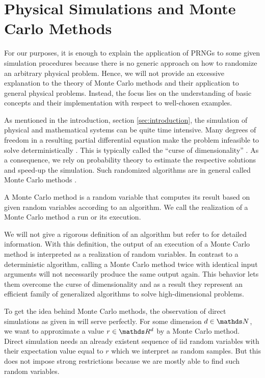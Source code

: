 \documentclass{stdlocal}
\begin{document}
\section{Physical Simulations and Monte Carlo Methods} %
\label{sub:simulation_in_physics_and_mathematics}
  For our purposes, it is enough to explain the application of PRNGs to some given simulation procedures because there is no generic approach on how to randomize an arbitrary physical problem.
  Hence, we will not provide an excessive explanation to the theory of Monte Carlo methods and their application to general physical problems.
  Instead, the focus lies on the understanding of basic concepts and their implementation with respect to well-chosen examples.

  As mentioned in the introduction, section \ref{sec:introduction}, the simulation of physical and mathematical systems can be quite time intensive.
  Many degrees of freedom in a resulting partial differential equation make the problem infeasible to solve deterministically \autocite{landau2014}.
  This is typically called the \enquote{curse of dimensionality} \autocite{mueller2012}.
  As a consequence, we rely on probability theory to estimate the respective solutions and speed-up the simulation.
  Such randomized algorithms are in general called Monte Carlo methods \autocite{mueller2012,landau2014}.

  \begin{definition}[Monte Carlo Method]
    A Monte Carlo method is a random variable that computes its result based on given random variables according to an algorithm.
    We call the realization of a Monte Carlo method a run or its execution.
  \end{definition}
  We will not give a rigorous definition of an algorithm but refer to \textcite{hromkovic2011} for detailed information.
  With this definition, the output of an execution of a Monte Carlo method is interpreted as a realization of random variables.
  In contrast to a deterministic algorithm, calling a Monte Carlo method twice with identical input arguments will not necessarily produce the same output again.
  This behavior lets them overcome the curse of dimensionality and as a result they represent an efficient family of generalized algorithms to solve high-dimensional problems.

  To get the idea behind Monte Carlo methods, the observation of direct simulations as given in \textcite{mueller2012} will serve perfectly.
  For some dimension $d\in\setNatural$, we want to approximate a value $r\in\setReal^d$ by a Monte Carlo method.
  Direct simulation needs an already existent sequence of iid random variables with their expectation value equal to $r$ which we interpret as random samples.
  But this does not impose strong restrictions because we are mostly able to find such random variables.
\end{document}
